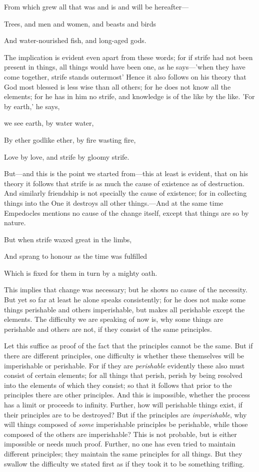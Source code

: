 From which grew all that was and is and will be hereafter—

Trees, and men and women, and beasts and birds

And water-nourished fish, and long-aged gods.

The implication is evident even apart from these words; for if strife had not been present in things, all things would have been one, as he says—'when they have come together, strife stands outermost' Hence it also follows on his theory that God most blessed is less wise than all others; for he does not know all the elements; for he has in him no strife, and knowledge is of the like by the like. 'For by earth,' he says,

we see earth, by water water,

By ether godlike ether, by fire wasting fire,

Love by love, and strife by gloomy strife.

But—and this is the point we started from—this at least is evident, that on his theory it follows that strife is as much the cause of existence as of destruction. And similarly friendship is not specially the cause of existence; for in collecting things into the One it destroys all other things.—And at the same time Empedocles mentions no cause of the change itself, except that things are so by nature.

But when strife waxed great in the limbs, 

And sprang to honour as the time was fulfilled 

Which is fixed for them in turn by a mighty oath.

This implies that change was necessary; but he shows no cause of the necessity. But yet so far at least he alone speaks consistently; for he does not make some things perishable and others imperishable, but makes all perishable except the elements. The difficulty we are speaking of now is, why some things are perishable and others are not, if they consist of the same principles.

Let this suffice as proof of the fact that the principles cannot be the same. But if there are different principles, one difficulty is whether these themselves will be imperishable or perishable. For if they are \emph{perishable} evidently these also must consist of certain elements; for all things that perish, perish by being resolved into the elements of which they consist; so that it follows that prior to the principles there are other principles. And this is impossible, whether the process has a limit or proceeds to infinity. Further, how will perishable things exist, if their principles are to be destroyed? But if the principles are \emph{imperishable}, why will things composed of \emph{some} imperishable principles be perishable, while those composed of the others are imperishable? This is not probable, but is either impossible or needs much proof. Further, no one has even tried to maintain different principles; they maintain the same principles for all things. But they swallow the difficulty we stated first as if they took it to be something trifling.

